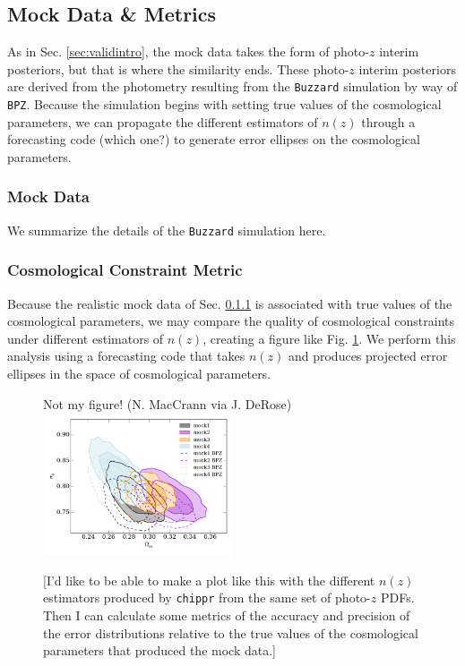 \documentclass[iop]{emulateapj}
\begin{document}
\subsection{Mock Data \& Metrics}
\label{sec:appintro}

As in Sec. \ref{sec:validintro}, the mock data takes the form of photo-$z$ 
interim posteriors, but that is where the similarity ends.  These photo-$z$ 
interim posteriors are derived from the photometry resulting from the 
\texttt{Buzzard} simulation by way of \texttt{BPZ}.  Because the simulation 
begins with setting true values of the cosmological parameters, we can 
propagate the different estimators of $n(z)$ through a forecasting code (which 
one?) to generate error ellipses on the cosmological parameters.

\subsubsection{Mock Data}
\label{sec:buzzard}

We summarize the details of the \texttt{Buzzard} simulation here.

\subsubsection{Cosmological Constraint Metric}
\label{sec:cosmo}

Because the realistic mock data of Sec. \ref{sec:buzzard} is associated with 
true values of the cosmological parameters, we may compare the quality of 
cosmological constraints under different estimators of $n(z)$, creating a 
figure like Fig. \ref{fig:scgsr}.  We perform this analysis using a forecasting 
code that takes $n(z)$ and produces projected error ellipses in the space of 
cosmological parameters.  

\begin{figure}
	\begin{center}
		Not my figure! (N. MacCrann via J. DeRose)
		\includegraphics[width=0.5\textwidth]{cosmo_constraints.png}
		\caption{[I'd like to be able to make a plot like this with the 
different $n(z)$ estimators produced by \texttt{chippr} from the same set of 
photo-$z$ PDFs.  Then I can calculate some metrics of the accuracy and 
precision of the error distributions relative to the true values of the 
cosmological parameters that produced the mock data.]}
		\label{fig:scgsr}
	\end{center}
\end{figure}
\end{document}
